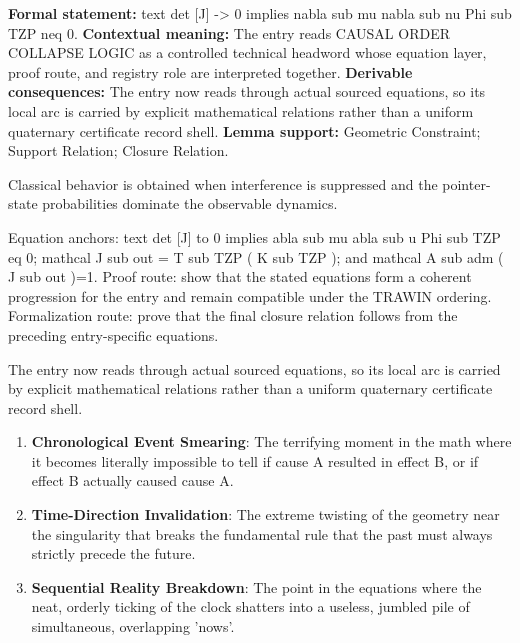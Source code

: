 \begingroup\footnotesize\setlength{\emergencystretch}{3em}\sloppy
\textbf{Formal statement:} text det [J] -> 0 implies nabla sub mu nabla sub nu Phi sub TZP neq 0. \textbf{Contextual meaning:} The entry reads CAUSAL ORDER COLLAPSE LOGIC as a controlled technical headword whose equation layer, proof route, and registry role are interpreted together. \textbf{Derivable consequences:} The entry now reads through actual sourced equations, so its local arc is carried by explicit mathematical relations rather than a uniform quaternary certificate record shell. \textbf{Lemma support:} Geometric Constraint; Support Relation; Closure Relation.\par
\endgroup

Classical behavior is obtained when interference is suppressed and the pointer-state probabilities dominate the observable dynamics.

Equation anchors: text det [J] to 0 implies abla sub mu abla sub u Phi sub TZP eq 0; mathcal J sub out = T sub TZP ( K sub TZP ); and mathcal A sub adm ( J sub out )=1. Proof route: show that the stated equations form a coherent progression for the entry and remain compatible under the TRAWIN ordering. Formalization route: prove that the final closure relation follows from the preceding entry-specific equations.

The entry now reads through actual sourced equations, so its local arc is carried by explicit mathematical relations rather than a uniform quaternary certificate record shell.
\endgroup

\begin{enumerate}[leftmargin=1.6em,itemsep=6pt,topsep=4pt]
\item \textbf{Chronological Event Smearing}: The terrifying moment in the math where it becomes literally impossible to tell if cause A resulted in effect B, or if effect B actually caused cause A.
\item \textbf{Time-Direction Invalidation}: The extreme twisting of the geometry near the singularity that breaks the fundamental rule that the past must always strictly precede the future.
\item \textbf{Sequential Reality Breakdown}: The point in the equations where the neat, orderly ticking of the clock shatters into a useless, jumbled pile of simultaneous, overlapping 'nows'.
\end{enumerate}

